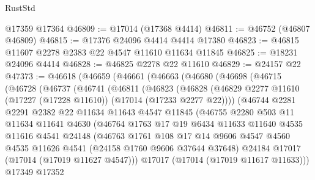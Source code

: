 \begin{lexlean}{RustStd}
\begin{coremodule}
    @17359
    @17364
@46809 := @17014 (@17368 @4414)
@46811 := @46752 (@46807 @46809)
@46815 := @17376 @24096 @4414 @4414 @17380
@46823 := @46815 @11607 @2278 @2383 @22 @4547 @11610 @11634 @11845
@46825 := @18231 @24096 @4414
@46828 := @46825 @2278 @22 @11610
@46829 := @24157 @22
@47373 := @46618
    (@46659
      (@46661
        (@46663
          (@46680
            (@46698
              (@46715
                (@46728
                  (@46737
                    (@46741
                      (@46811
                        (@46823
                          (@46828
                            (@46829
                              @2277
                              @11610
                              (@17227 (@17228 @11610))
                              (@17014 (@17233 @2277 @22))))
                          (@46744
                            @2281
                            @2291
                            @2382
                            @22
                            @11634
                            @11643
                            @4547
                            @11845
                            (@46755
                              @2280
                              @503
                              @11
                              @11634
                              @11641
                              @4630
                              (@46764
                                @1763
                                @17
                                @19
                                @6434
                                @11633
                                @11640
                                @4535
                                @11616
                                @4541
                                @24148
                                (@46763
                                  @1761
                                  @108
                                  @17
                                  @14
                                  @9606
                                  @4547
                                  @4560
                                  @4535
                                  @11626
                                  @4541
                                  (@24158 @1760 @9606 @37644 @37648)
                                  @24184
                                  @17017
                                  (@17014 (@17019 @11627 @4547)))
                                @17017
                                (@17014 (@17019 @11617 @11633)))
                              @17349
                              @17352

\end{coremodule}
\end{lexlean}

